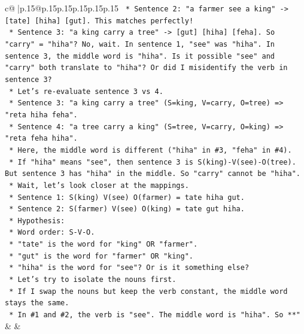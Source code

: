 \documentclass{article}
\begin{document}
{\begin{supertabular}{c@{$\;$}|p{.15\linewidth}@{}p{.15\linewidth}p{.15\linewidth}p{.15\linewidth}p{.15\linewidth}p{.15\linewidth}}
{{{\texttt{            *   Sentence 2: "a farmer see a king" {-}> {[}tate{]} {[}hiha{]} {[}gut{]}. This matches perfectly!} \\
\texttt{            *   Sentence 3: "a king carry a tree" {-}> {[}gut{]} {[}hiha{]} {[}feha{]}. So "carry" = "hiha"? No, wait. In sentence 1, "see" was "hiha". In sentence 3, the middle word is "hiha". Is it possible "see" and "carry" both translate to "hiha"? Or did I misidentify the verb in sentence 3?} \\
\texttt{            *   Let's re{-}evaluate sentence 3 vs 4.} \\
\texttt{            *   Sentence 3: "a king carry a tree" (S=king, V=carry, O=tree) => "reta hiha feha".} \\
\texttt{            *   Sentence 4: "a tree carry a king" (S=tree, V=carry, O=king) => "reta feha hiha".} \\
\texttt{            *   Here, the middle word is different ("hiha" in \#3, "feha" in \#4).} \\
\texttt{            *   If "hiha" means "see", then sentence 3 is S(king){-}V(see){-}O(tree). But sentence 3 has "hiha" in the middle. So "carry" cannot be "hiha".} \\
\texttt{            *   Wait, let's look closer at the mappings.} \\
\texttt{            *   Sentence 1: S(king) V(see) O(farmer) = tate hiha gut.} \\
\texttt{            *   Sentence 2: S(farmer) V(see) O(king) = tate gut hiha.} \\
\texttt{            *   Hypothesis:} \\
\texttt{                *   Word order: S{-}V{-}O.} \\
\texttt{                *   "tate" is the word for "king" OR "farmer".} \\
\texttt{                *   "gut" is the word for "farmer" OR "king".} \\
\texttt{                *   "hiha" is the word for "see"? Or is it something else?} \\
\texttt{            *   Let's try to isolate the nouns first.} \\
\texttt{            *   If I swap the nouns but keep the verb constant, the middle word stays the same.} \\
\texttt{            *   In \#1 and \#2, the verb is "see". The middle word is "hiha". So **"} \\
            }
        }
    }
    & & \\ \\


\end{supertabular}}
\end{document}
